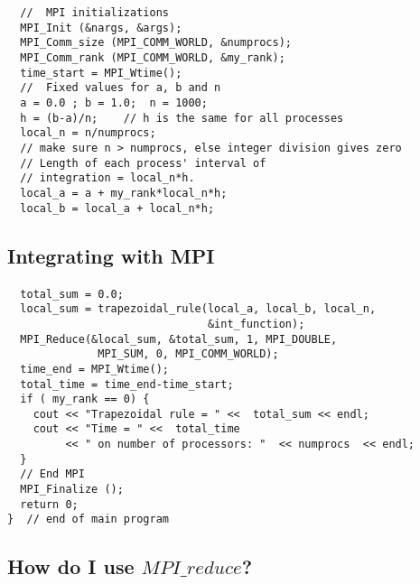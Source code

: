 \documentclass[%
oneside,                 %
final,                   %
10pt]{article}
\begin{document}
\begin{verbatim}
  //  MPI initializations
  MPI_Init (&nargs, &args);
  MPI_Comm_size (MPI_COMM_WORLD, &numprocs);
  MPI_Comm_rank (MPI_COMM_WORLD, &my_rank);
  time_start = MPI_Wtime();
  //  Fixed values for a, b and n 
  a = 0.0 ; b = 1.0;  n = 1000;
  h = (b-a)/n;    // h is the same for all processes 
  local_n = n/numprocs;  
  // make sure n > numprocs, else integer division gives zero
  // Length of each process' interval of
  // integration = local_n*h.  
  local_a = a + my_rank*local_n*h;
  local_b = local_a + local_n*h;
\end{verbatim}



\subsection*{Integrating with \textbf{MPI}}

\paragraph{}

\begin{verbatim}
  total_sum = 0.0;
  local_sum = trapezoidal_rule(local_a, local_b, local_n, 
                               &int_function); 
  MPI_Reduce(&local_sum, &total_sum, 1, MPI_DOUBLE, 
              MPI_SUM, 0, MPI_COMM_WORLD);
  time_end = MPI_Wtime();
  total_time = time_end-time_start;
  if ( my_rank == 0) {
    cout << "Trapezoidal rule = " <<  total_sum << endl;
    cout << "Time = " <<  total_time  
         << " on number of processors: "  << numprocs  << endl;
  }
  // End MPI
  MPI_Finalize ();  
  return 0;
}  // end of main program
\end{verbatim}



\subsection*{How do I use $MPI\_reduce$?}

\paragraph{}
\end{document}
